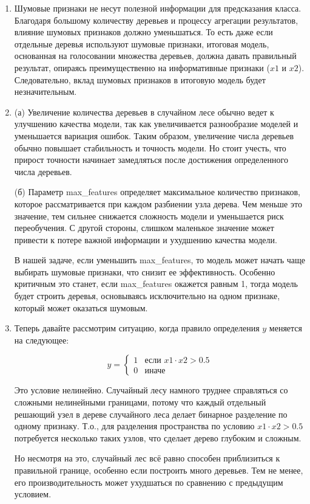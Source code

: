 \begin{enumerate}

\item Шумовые признаки не несут полезной информации для предсказания класса. Благодаря большому количеству деревьев и процессу агрегации результатов, влияние шумовых признаков должно уменьшаться. То есть даже если отдельные деревья используют шумовые признаки, итоговая модель, основанная на голосовании множества деревьев, должна давать правильный результат, опираясь преимущественно на информативные признаки ($x1$ и $x2$). Следовательно, вклад шумовых признаков в итоговую модель будет незначительным.

\item (а) Увеличение количества деревьев в случайном лесе обычно ведет к улучшению качества модели, так как увеличивается разнообразие моделей и уменьшается вариация ошибок. Таким образом, увеличение числа деревьев обычно повышает стабильность и точность модели. Но стоит учесть, что прирост точности начинает замедляться после достижения определенного числа деревьев.

    (б) Параметр max\_features определяет максимальное количество признаков, которое рассматривается при каждом разбиении узла дерева. Чем меньше это значение, тем сильнее снижается сложность модели и уменьшается риск переобучения. С другой стороны, слишком маленькое значение может привести к потере важной информации и ухудшению качества модели.
    
    В нашей задаче, если уменьшить max\_features, то модель может начать чаще выбирать шумовые признаки, что снизит ее эффективность. Особенно критичным это станет, если max\_features окажется равным 1, тогда модель будет строить деревья, основываясь исключительно на одном признаке, который может оказаться шумовым.

\item Теперь давайте рассмотрим ситуацию, когда правило определения $y$ меняется на следующее:

$$
y = \begin{cases}
1 & \text{если } x1 \cdot x2 > 0.5 \\
0 & \text{иначе}
\end{cases}
$$

Это условие нелинейно. Случайный лесу намного труднее справляться со сложными нелинейными границами, потому что каждый отдельный решающий узел в дереве случайного леса делает бинарное разделение по одному признаку. Т.о., для разделения пространства по условию $x1 \cdot x2 > 0.5$ потребуется несколько таких узлов, что сделает дерево глубоким и сложным.

Но несмотря на это, случайный лес всё равно способен приблизиться к правильной границе, особенно если построить много деревьев. Тем не менее, его производительность может ухудшаться по сравнению с предыдущим условием.

\end{enumerate}
